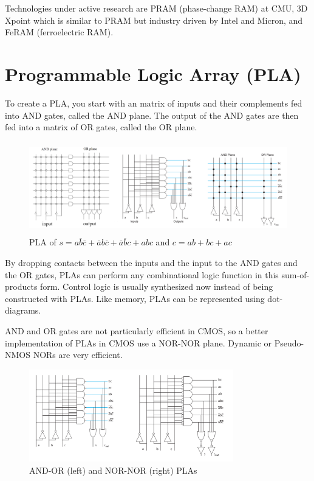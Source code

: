 \documentclass{article}
\begin{document}
Technologies under active research are PRAM (phase-change RAM) at CMU, 3D Xpoint which is similar to PRAM but industry driven by Intel and Micron, and FeRAM (ferroelectric RAM). 

\section{Programmable Logic Array (PLA)}

To create a PLA, you start with an matrix of inputs and their complements fed into AND gates, called the AND plane. The output of the AND gates are then fed into a matrix of OR gates, called the OR plane. 

\begin{figure}[ht!]
\centering
\includegraphics[height=40mm]{PLA.png}
\caption{PLA of $s=a\overline{b}\overline{c}+\overline{a}b\overline{c}+\overline{a}\overline{b}c+abc$ and $c=ab+bc+ac$}
\end{figure}

By dropping contacts between the inputs and the input to the AND gates and the OR gates, PLAs can perform any combinational logic function in this sum-of-products form. Control logic is usually synthesized now instead of being constructed with PLAs. Like memory, PLAs can be represented using dot-diagrams. 

AND and OR gates are not particularly efficient in CMOS, so a better implementation of PLAs in CMOS use a NOR-NOR plane. Dynamic or Pseudo-NMOS NORs are very efficient. 

\begin{figure}[ht!]
\centering
\includegraphics[height=40mm]{NORNOR.png}
\caption{AND-OR (left) and NOR-NOR (right) PLAs}
\end{figure}
\end{document}
